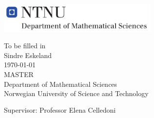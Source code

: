 
\thispagestyle{empty}
\includegraphics[height=0.6in]{fig/rams}
\mbox{}\\[6pc]
\begin{center}
\Huge{To be filled in}\\[2pc]

\Large{Sindre Eskeland}\\[1pc]
\large{\today}\\[2pc]

MASTER\\
Department of Mathematical Sciences\\
Norwegian University of Science and Technology
\end{center}
\vfill

\noindent Supervisor: Professor Elena Celledoni


